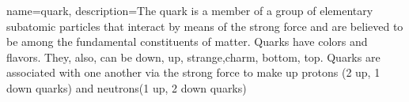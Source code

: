 {
    name=quark,
    description={The quark is a member of a group of elementary subatomic particles that interact by means of the strong force and are believed to be among the fundamental constituents of matter. Quarks have colors and flavors. They, also, can be down, up, strange,charm, bottom, top. Quarks are associated with one another via the strong force to make up protons (2 up, 1 down quarks) and neutrons(1 up, 2 down quarks)}
}
